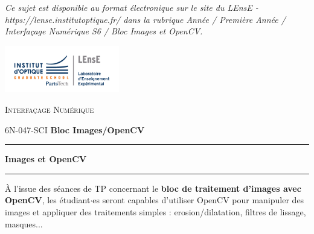 \documentclass[a4paper,11pt,titlepage]{article} %
\begin{document}
\begin{titlepage}
\begin{center}
\vfill

\textit{Ce sujet est disponible au format électronique sur le site du LEnsE - https://lense.institutoptique.fr/ dans la rubrique Année / Première Année / Interfaçage Numérique S6 / Bloc Images et OpenCV.}



\end{center}
\end{titlepage}

\newpage
\strut %

\newpage
\pagestyle{empty}

\begin{minipage}[c]{.25\linewidth}
	\includegraphics[width=5cm]{images/Logo-LEnsE.png}
\end{minipage} \hfill
\begin{minipage}[c]{.4\linewidth}

\begin{center}
\vspace{0.3cm}
{\Large \textsc{Interfaçage Numérique}}

\medskip

6N-047-SCI \qquad \textbf{\large Bloc Images/OpenCV}

\end{center}
\end{minipage}\hfill

\vspace{0.5cm}

\noindent \rule{\linewidth}{1pt}

{\noindent\Large  \rule[-7pt]{0pt}{30pt} \textbf{Images et OpenCV}}

\noindent \rule{\linewidth}{1pt}

\bigskip 


{\large À l'issue des séances de TP concernant le \textbf{bloc de traitement d'images avec OpenCV}, les étudiant$\cdot$es seront capables d'utiliser OpenCV pour manipuler des images et appliquer des traitements simples : erosion/dilatation, filtres de lissage, masques...}

\medskip
\end{document}
